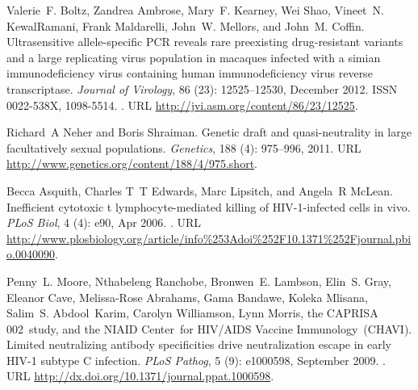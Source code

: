 \documentclass[11pt]{article}
\begin{document}
\begin{thebibliography}{48}
Valerie~F. Boltz, Zandrea Ambrose, Mary~F. Kearney, Wei Shao, Vineet~N.
  {KewalRamani}, Frank Maldarelli, John~W. Mellors, and John~M. Coffin.
\newblock Ultrasensitive allele-specific {PCR} reveals rare preexisting
  drug-resistant variants and a large replicating virus population in macaques
  infected with a simian immunodeficiency virus containing human
  immunodeficiency virus reverse transcriptase.
\newblock \emph{Journal of Virology}, 86 (23): 12525--12530,
  December 2012.
\newblock ISSN 0022-{538X}, 1098-5514.
\newblock {}.
\newblock URL \url{http://jvi.asm.org/content/86/23/12525}.

Richard~A Neher and Boris Shraiman.
\newblock Genetic draft and quasi-neutrality in large facultatively sexual
  populations.
\newblock \emph{Genetics}, 188 (4): 975--996, 2011.
\newblock URL \url{http://www.genetics.org/content/188/4/975.short}.

Becca Asquith, Charles T~T Edwards, Marc Lipsitch, and Angela~R McLean.
\newblock Inefficient cytotoxic t lymphocyte-mediated killing of
  {HIV}-1-infected cells in vivo.
\newblock \emph{PLoS Biol}, 4 (4): e90, Apr 2006.
\newblock {}.
\newblock URL
  \url{http://www.plosbiology.org/article/info%253Adoi%252F10.1371%252Fjournal.pbio.0040090}.

Penny~L. Moore, Nthabeleng Ranchobe, Bronwen~E. Lambson, Elin~S. Gray, Eleanor
  Cave, Melissa-Rose Abrahams, Gama Bandawe, Koleka Mlisana, Salim~S.
  Abdool~Karim, Carolyn Williamson, Lynn Morris, the {CAPRISA} 002~study, and
  the {NIAID} Center~for {HIV/AIDS} Vaccine Immunology~{(CHAVI)}.
\newblock Limited neutralizing antibody specificities drive neutralization
  escape in early {HIV-1} subtype {C} infection.
\newblock \emph{PLoS Pathog}, 5 (9): e1000598, September
  2009.
\newblock {}.
\newblock URL \url{http://dx.doi.org/10.1371/journal.ppat.1000598}.


\end{thebibliography}
\end{document}
